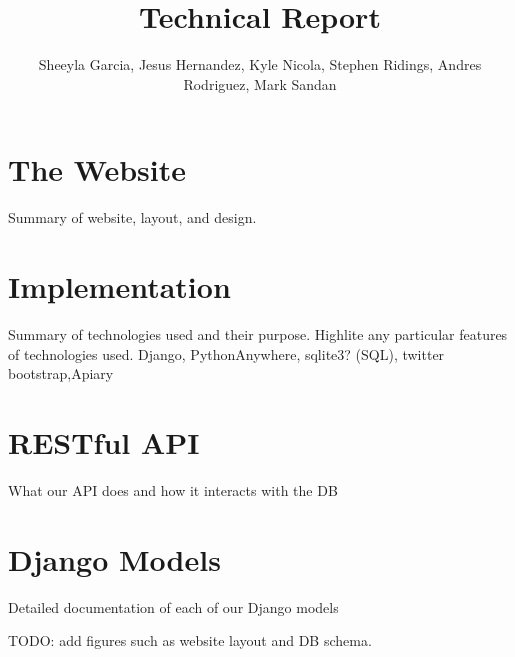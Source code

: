 \documentclass[12pt,leqno]{article}
\title{Technical Report}
\author{Sheeyla Garcia, Jesus Hernandez, Kyle Nicola, Stephen Ridings, Andres Rodriguez, Mark Sandan}
\date{ }
\numberwithin{equation}{section}
\theoremstyle{definition}
\begin{document}
\thispagestyle{plain}
 
\maketitle
 
\tableofcontents
 
\section{The Website}
Summary of website, layout, and design.  

\section{Implementation}
Summary of technologies used and their purpose. Highlite any particular features of technologies used.
Django, PythonAnywhere, sqlite3? (SQL), twitter bootstrap,Apiary
\section{RESTful  API}
What our API does and how it interacts with the DB
\section{Django Models}
Detailed documentation of each of our Django models

TODO: add figures such as website layout and DB schema.
\end{document}
